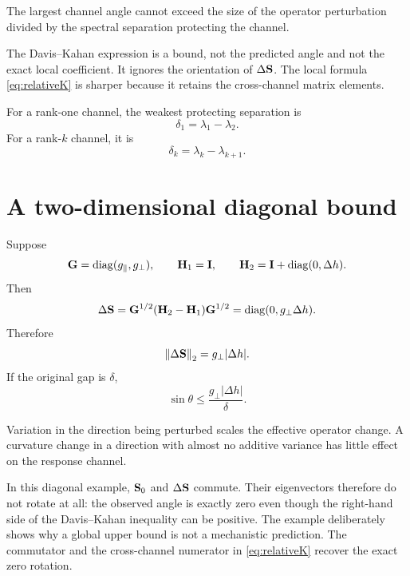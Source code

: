 \inwords The largest channel angle cannot exceed the size of the operator perturbation divided by the spectral separation protecting the channel.

\begin{cautionbox}
The Davis--Kahan expression is a bound, not the predicted angle and not the exact local coefficient. It ignores the orientation of \(\Delta\mathbf{S}\). The local formula \cref{eq:relativeK} is sharper because it retains the cross-channel matrix elements.
\end{cautionbox}

For a rank-one channel, the weakest protecting separation is
\begin{equation}
\delta_1=\lambda_1-\lambda_2.
\end{equation}
For a rank-\(k\) channel, it is
\begin{equation}
\delta_k=\lambda_k-\lambda_{k+1}.
\end{equation}

\section{A two-dimensional diagonal bound}

Suppose
\begin{equation}
\mathbf{G}=\operatorname{diag}(g_{\parallel},g_{\perp}),
\qquad
\mathbf{H}_1=\mathbf{I},
\qquad
\mathbf{H}_2=\mathbf{I}+\operatorname{diag}(0,\Delta h).
\end{equation}
Then
\begin{equation}
\Delta\mathbf{S}
=\mathbf{G}^{1/2}(\mathbf{H}_2-\mathbf{H}_1)\mathbf{G}^{1/2}
=\operatorname{diag}(0,g_{\perp}\Delta h).
\end{equation}
Therefore
\begin{equation}
\left\lVert \Delta\mathbf{S}\right\rVert_2=g_{\perp}|\Delta h|.
\end{equation}
If the original gap is \(\delta\),
\begin{equation}
\sin\theta\le\frac{g_{\perp}|\Delta h|}{\delta}.
\end{equation}

\inwords Variation in the direction being perturbed scales the effective operator change. A curvature change in a direction with almost no additive variance has little effect on the response channel.

\begin{cautionbox}
In this diagonal example, \(\mathbf{S}_0\) and \(\Delta\mathbf{S}\) commute. Their eigenvectors therefore do not rotate at all: the observed angle is exactly zero even though the right-hand side of the Davis--Kahan inequality can be positive. The example deliberately shows why a global upper bound is not a mechanistic prediction. The commutator and the cross-channel numerator in \cref{eq:relativeK} recover the exact zero rotation.
\end{cautionbox}

